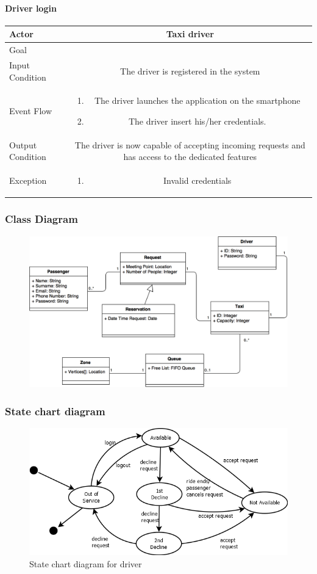 \documentclass[a4paper,12pt]{article}%
\newcommand{\usecasetable}[6]{
\begin{center}
\def\arraystretch{1.5}
\begin{tabularx}{\textwidth}{|s|C|}
\hline
Actor & #1\\
\hline
Goal & #2\\
\hline
Input Condition & #3 \\
\hline
Event Flow & #4\\
\hline
Output Condition & #5\\
\hline
Exception & #6\\
\hline
\end{tabularx}
\end{center}
}
\begin{document}
\paragraph{Driver login}
\usecasetable{Taxi driver}{}{The driver is registered in the system}
{
\begin{minipage}[b]{11cm}
\begin{enumerate}
\item The driver launches the application on the smartphone
\item The driver insert his/her credentials.
\end{enumerate}
\end{minipage}
}
{The driver is now capable of accepting incoming requests and has access to the dedicated features}
{
\begin{minipage}[b]{11cm}
\begin{enumerate}
\item Invalid credentials
\end{enumerate}
\end{minipage}
}
\break
\begin{landscape}
\subsubsection{Class Diagram}
\begin{figure}[H]
\includegraphics[scale=.5]{class_diagram.png}
\end{figure}
\end{landscape}
\break
\subsubsection{State chart diagram}
\begin{figure}[H]
\centering
\includegraphics[scale=.7]{state_chart_driver.png}
\caption{State chart diagram for driver}
\end{figure}
\break
\end{document}
